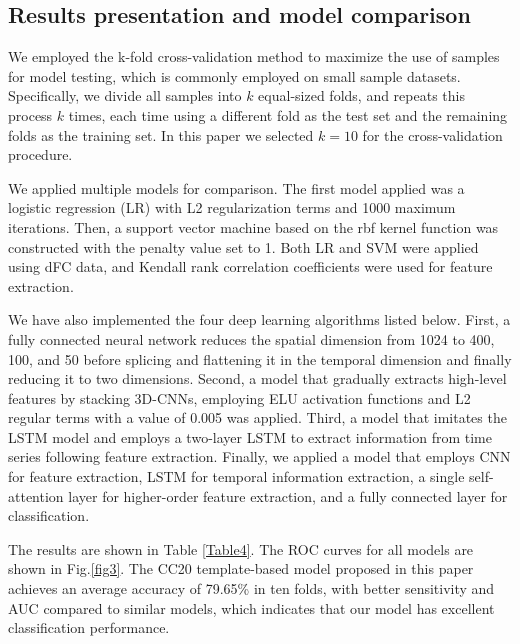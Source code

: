 \documentclass[journal,twoside,web]{ieeecolor}
\begin{document}
\subsection{Results presentation and model comparison}
We employed the k-fold cross-validation method to maximize the use of samples for model testing, which is commonly employed on small sample datasets. Specifically, we divide all samples into $k$ equal-sized folds, and repeats this process $k$ times, each time using a different fold as the test set and the remaining folds as the training set. In this paper we selected $k=10$ for the cross-validation procedure.

We applied multiple models for comparison. The first model applied was a logistic regression (LR) with L2 regularization terms and 1000 maximum iterations. Then, a support vector machine based on the rbf kernel function was constructed with the penalty value set to 1. Both LR and SVM were applied using dFC data, and Kendall rank correlation coefficients were used for feature extraction.

We have also implemented the four deep learning algorithms listed below. First, a fully connected neural network reduces the spatial dimension from 1024 to 400, 100, and 50 before splicing and flattening it in the temporal dimension and finally reducing it to two dimensions. Second, a model that gradually extracts high-level features by stacking 3D-CNNs, employing ELU activation functions and L2 regular terms with a value of 0.005 was applied\cite{deng2022diagnosing}. Third, a model that imitates the LSTM model and employs a two-layer LSTM to extract information from time series following feature extraction\cite{dvornek2017identifying}. Finally, we applied a model that employs CNN for feature extraction, LSTM for temporal information extraction, a single self-attention layer for higher-order feature extraction, and a fully connected layer for classification\cite{xu2021identification}.

The results are shown in Table \ref{Table4}. The ROC curves for all models are shown in Fig.\ref{fig3}. The CC20 template-based model proposed in this paper achieves an average accuracy of 79.65\% in ten folds, with better sensitivity and AUC compared to similar models, which indicates that our model has excellent classification performance. 
\end{document}
